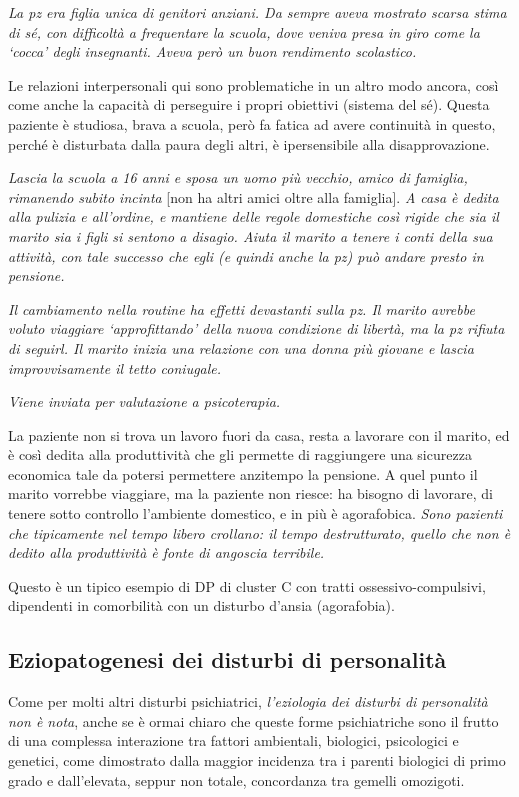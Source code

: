 \emph{La pz era figlia unica di genitori anziani. Da sempre aveva
mostrato scarsa stima di sé, con difficoltà a frequentare la scuola,
dove veniva presa in giro come la `cocca' degli insegnanti. Aveva però
un buon rendimento scolastico.}

Le relazioni interpersonali qui sono problematiche in un altro modo
ancora, così come anche la capacità di perseguire i propri obiettivi
(sistema del sé). Questa paziente è studiosa, brava a scuola, però fa
fatica ad avere continuità in questo, perché è disturbata dalla paura
degli altri, è ipersensibile alla disapprovazione.

\emph{Lascia la scuola a 16 anni e sposa un uomo più vecchio, amico di
famiglia, rimanendo subito incinta} {[}non ha altri amici oltre alla
famiglia{]}. \emph{A casa è dedita alla pulizia e all'ordine, e mantiene
delle regole domestiche così rigide che sia il marito sia i figli si
sentono a disagio. Aiuta il marito a tenere i conti della sua attività,
con tale successo che egli (e quindi anche la pz) può andare presto in
pensione. }

\emph{Il cambiamento nella routine ha effetti devastanti sulla pz. Il
marito avrebbe voluto viaggiare `approfittando' della nuova condizione
di libertà, ma la pz rifiuta di seguirl. Il marito inizia una relazione
con una donna più giovane e lascia improvvisamente il tetto coniugale.}

\emph{Viene inviata per valutazione a psicoterapia.}

La paziente non si trova un lavoro fuori da casa, resta a lavorare con
il marito, ed è così dedita alla produttività che gli permette di
raggiungere una sicurezza economica tale da potersi permettere anzitempo
la pensione. A quel punto il marito vorrebbe viaggiare, ma la paziente
non riesce: ha bisogno di lavorare, di tenere sotto controllo l'ambiente
domestico, e in più è agorafobica. \emph{Sono pazienti che tipicamente
nel tempo libero crollano: il tempo destrutturato, quello che non è
dedito alla produttività è fonte di angoscia terribile. }

Questo è un tipico esempio di DP di cluster C con tratti
ossessivo-compulsivi, dipendenti in comorbilità con un disturbo d'ansia
(agorafobia).

\subsection{Eziopatogenesi dei disturbi di personalità}

Come per molti altri disturbi psichiatrici, \emph{l'eziologia dei
disturbi di personalità non è nota}, anche se è ormai chiaro che queste
forme psichiatriche sono il frutto di una complessa interazione tra
fattori ambientali, biologici, psicologici e genetici, come dimostrato
dalla maggior incidenza tra i parenti biologici di primo grado e
dall'elevata, seppur non totale, concordanza tra gemelli omozigoti.

